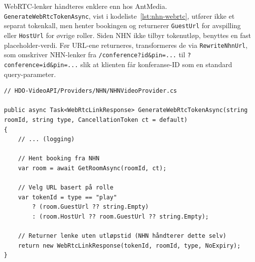 WebRTC-lenker håndteres enklere enn hos AntMedia. \texttt{GenerateWebRtcTokenAsync}, vist i kodeliste~\ref{lst:nhn-webrtc}, utfører ikke et separat tokenkall, men henter bookingen og returnerer \texttt{GuestUrl} for avspilling eller \texttt{HostUrl} for øvrige roller. Siden NHN ikke tilbyr tokenutløp, benyttes en fast placeholder-verdi. Før URL-ene returneres, transformeres de via \texttt{RewriteNhnUrl}, som omskriver NHN-lenker fra \texttt{/conference?id\&pin=...} til \texttt{?conference=id\&pin=...} slik at klienten får konferanse-ID som en standard query-parameter.

\begin{lstlisting}[language={[Sharp]C}, label=lst:nhn-webrtc, caption={Opprettelse av NHN WebRTC-lenke.}]
// HDO-VideoAPI/Providers/NHN/NHNVideoProvider.cs

public async Task<WebRtcLinkResponse> GenerateWebRtcTokenAsync(string roomId, string type, CancellationToken ct = default)
{
    // ... (logging)
    
    // Hent booking fra NHN
    var room = await GetRoomAsync(roomId, ct);

    // Velg URL basert på rolle
    var tokenId = type == "play" 
        ? (room.GuestUrl ?? string.Empty) 
        : (room.HostUrl ?? room.GuestUrl ?? string.Empty);

    // Returner lenke uten utløpstid (NHN håndterer dette selv)
    return new WebRtcLinkResponse(tokenId, roomId, type, NoExpiry);
}
\end{lstlisting}


